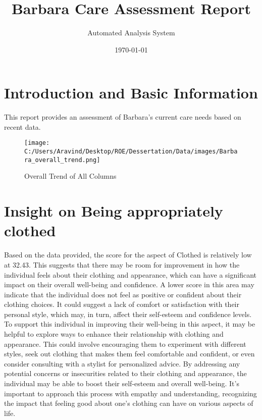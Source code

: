 \documentclass[10pt, a4paper]{article}%
\title{Barbara Care Assessment Report}%
\author{Automated Analysis System}%
\date{\today}%
\begin{document}
%
\normalsize%
\maketitle%
\section{Introduction and Basic Information}%
\label{sec:IntroductionandBasicInformation}%
This report provides an assessment of Barbara's current care needs based on recent data.%


\begin{figure}[H]%
\centering%
\texttt{[image: C:/Users/Aravind/Desktop/ROE/Dessertation/Data/images/Barbara\_overall\_trend.png]}%
\caption{Overall Trend of All Columns}%
\end{figure}

%
\section{Insight on Being appropriately clothed}%
\label{sec:InsightonBeingappropriatelyclothed}%
Based on the data provided, the score for the aspect of Clothed is relatively low at 32.43. This suggests that there may be room for improvement in how the individual feels about their clothing and appearance, which can have a significant impact on their overall well{-}being and confidence.\newline%
\newline%
A lower score in this area may indicate that the individual does not feel as positive or confident about their clothing choices. It could suggest a lack of comfort or satisfaction with their personal style, which may, in turn, affect their self{-}esteem and confidence levels.\newline%
\newline%
To support this individual in improving their well{-}being in this aspect, it may be helpful to explore ways to enhance their relationship with clothing and appearance. This could involve encouraging them to experiment with different styles, seek out clothing that makes them feel comfortable and confident, or even consider consulting with a stylist for personalized advice.\newline%
\newline%
By addressing any potential concerns or insecurities related to their clothing and appearance, the individual may be able to boost their self{-}esteem and overall well{-}being. It's important to approach this process with empathy and understanding, recognizing the impact that feeling good about one's clothing can have on various aspects of life.%
\end{document}
